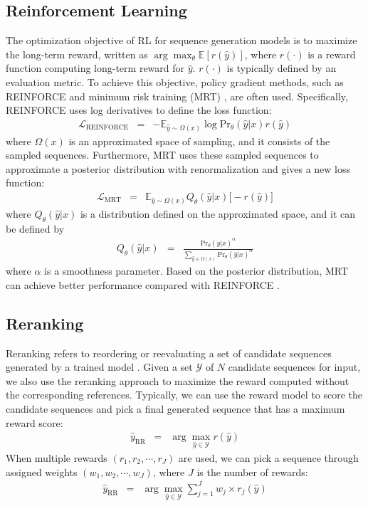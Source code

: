 \documentclass[lettersize,journal]{IEEEtran}
\begin{document}
\subsection{Reinforcement Learning}
The optimization objective of RL for sequence generation models is to maximize the long-term reward, written as $\arg\max_{\theta}\mathbb{E} [r(\hat{y})]$, where $r(\cdot)$ is a reward function computing long-term reward for $\hat{y}$.
$r(\cdot)$ is typically defined by an evaluation metric.
To achieve this objective, policy gradient methods, such as REINFORCE \cite{williams1992simple} and minimum risk training (MRT) \cite{shen2015minimum}, are often used. 
Specifically,  REINFORCE uses log derivatives to define the loss function:
\begin{eqnarray}
		\mathcal{L}_{\mathrm{REINFORCE}} &=&  -\mathbb{E}_{\hat{y} \sim \Omega(x)}\log \mathrm{Pr}_{\theta}(\hat{y}|x) r(\hat{y})
 \label{eq-pg}
\end{eqnarray}
where $\Omega(x)$ is an approximated space of sampling, and it consists of the sampled sequences.
Furthermore, MRT uses these sampled sequences to approximate a posterior distribution with renormalization and gives a new loss function:
\begin{eqnarray}
		\mathcal{L}_{\mathrm{MRT}} &=& \mathbb{E}_{\hat{y}\sim \Omega(x)}Q_{\theta}(\hat{y}|x)\big[-r(\hat{y})\big]
	\label{eq-mrt}
\end{eqnarray}
where $Q_{\theta}(\hat{y}|x)$ is a distribution defined on the approximated space, and it can be defined by
\begin{eqnarray}
		Q_{\theta}(\hat{y}|x) &=& \frac{\mathrm{Pr}_{\theta}(\hat{y}|x)^{\alpha}}{\sum_{\hat{y}\in \Omega(x)}\mathrm{Pr}_{\theta}(\hat{y}|x)^{\alpha}}
\end{eqnarray}
where $\alpha$ is a smoothness parameter.
Based on the posterior distribution, MRT can achieve better performance compared with REINFORCE \cite{kiegeland2021revisiting, donato2022mad}.

\subsection{Reranking}
Reranking refers to reordering or reevaluating a set of candidate sequences generated by a trained model \cite{shen2014dependency, lee2021discriminative, liu2021addressing}.
Given a set $\mathcal{Y}$ of $N$ candidate sequences for input, we also use the reranking approach to maximize the reward computed without the corresponding references.
Typically, we can use the reward model to score the candidate 
sequences and pick a final generated sequence that has a maximum reward score:
\begin{eqnarray}
    \hat{y}_{\mathrm{RR}} &=& \arg\max_{\hat{y}\in\mathcal{Y}}r(\hat{y})
\end{eqnarray}
When multiple rewards $(r_{1}, r_{2}, \cdots, r_{J})$ are used, we can pick a sequence through assigned weights $(w_{1}, w_{2}, \cdots, w_{J})$, where $J$ is the number of rewards:
\begin{eqnarray}
		\hat{y}_{\mathrm{RR}} &=& \arg\max_{\hat{y}\in\mathcal{Y}} \sum_{j=1}^{J} w_{j} \times r_{j}(\hat{y})
\end{eqnarray}
\end{document}
